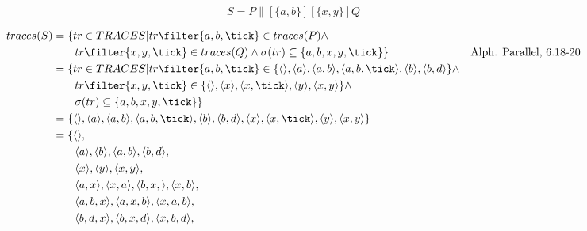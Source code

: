\documentclass{scrreprt}
\begin{document}
\newpage

\begin{equation*}
  S = P \parallel[\{a, b\}][\{x, y\}] Q
\end{equation*}

\begin{align*}
  traces(S) &= \{ tr \in TRACES | tr \filter \{ a, b, \tick \} \in traces(P) \wedge \\
            &\hspace{0.7cm} tr \filter \{ x, y, \tick \} \in traces(Q)
            \wedge \sigma(tr) \subseteq \{ a, b, x, y, \tick \} \} &
            \text{Alph. Parallel, 6.18-20} \\
            &= \{ tr \in TRACES | tr \filter \{ a, b, \tick \} \in  \{ \langle \rangle, \langle a \rangle, \langle a, b \rangle, \langle a, b, \tick \rangle, \langle b \rangle, \langle b, d \rangle \} \wedge \\
            &\hspace{0.7cm} tr \filter \{ x, y, \tick \} \in \{ \langle \rangle, \langle x \rangle, \langle x, \tick \rangle, \langle y \rangle, \langle x, y \rangle \} \wedge \\
            &\hspace{0.7cm} \sigma(tr) \subseteq \{ a, b, x, y, \tick \} \} \\
            &= \{ \langle \rangle, \langle a \rangle, \langle a, b \rangle, \langle a, b, \tick \rangle, \langle b \rangle, \langle b, d \rangle, \langle x \rangle, \langle x, \tick \rangle, \langle y \rangle, \langle x, y \rangle \} \\
&= \{ \langle \rangle,\\
&\hspace{0.7cm}\langle a \rangle, \langle b \rangle, \langle a, b \rangle, \langle b, d \rangle,\\
&\hspace{0.7cm}\langle x \rangle, \langle y \rangle, \langle x, y \rangle,\\
&\hspace{0.7cm}\langle a, x \rangle, \langle x, a \rangle,
               \langle b, x, \rangle, \langle x, b \rangle,\\
&\hspace{0.7cm}\langle a, b, x \rangle, \langle a, x, b \rangle, \langle x, a, b \rangle,\\
&\hspace{0.7cm}\langle b, d, x \rangle,  \langle b, x, d \rangle,  \langle x, b, d \rangle,\\

\end{align*}
\end{document}
